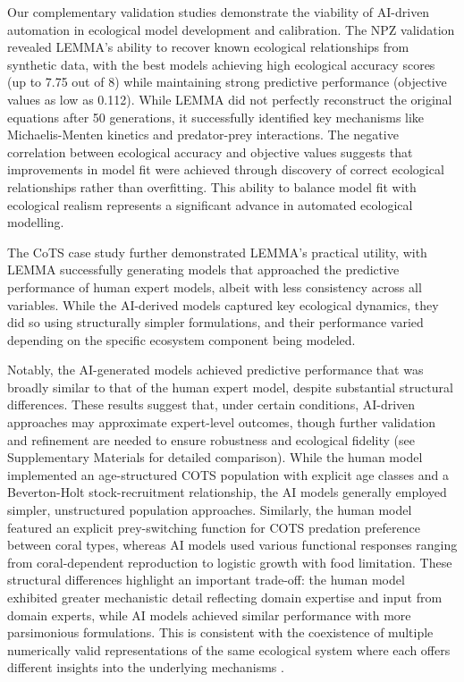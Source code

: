 Our complementary validation studies demonstrate the viability of AI-driven automation in ecological model development and calibration. The NPZ validation revealed LEMMA's ability to recover known ecological relationships from synthetic data, with the best models achieving high ecological accuracy scores (up to 7.75 out of 8) while maintaining strong predictive performance (objective values as low as 0.112). While LEMMA did not perfectly reconstruct the original equations after 50 generations, it successfully identified key mechanisms like Michaelis-Menten kinetics and predator-prey interactions. The negative correlation between ecological accuracy and objective values suggests that improvements in model fit were achieved through discovery of correct ecological relationships rather than overfitting. This ability to balance model fit with ecological realism represents a significant advance in automated ecological modelling.

The CoTS case study further demonstrated LEMMA's practical utility, with LEMMA successfully generating models that approached the predictive performance of human expert models, albeit with less consistency across all variables. While the AI-derived models captured key ecological dynamics, they did so using structurally simpler formulations, and their performance varied depending on the specific ecosystem component being modeled.

Notably, the AI-generated models achieved predictive performance that was broadly similar to that of the human expert model, despite substantial structural differences. These results suggest that, under certain conditions, AI-driven approaches may approximate expert-level outcomes, though further validation and refinement are needed to ensure robustness and ecological fidelity (see Supplementary Materials for detailed comparison). While the human model implemented an age-structured COTS population with explicit age classes and a Beverton-Holt stock-recruitment relationship, the AI models generally employed simpler, unstructured population approaches. Similarly, the human model featured an explicit prey-switching function for COTS predation preference between coral types, whereas AI models used various functional responses ranging from coral-dependent reproduction to logistic growth with food limitation. These structural differences highlight an important trade-off: the human model exhibited greater mechanistic detail reflecting domain expertise and input from domain experts, while AI models achieved similar performance with more parsimonious formulations. This is consistent with the coexistence of multiple numerically valid representations of the same ecological system where each offers different insights into the underlying mechanisms \citep{patterson2001estimating}. 


